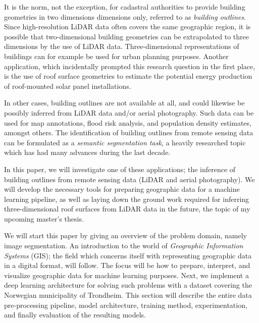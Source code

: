 It is the norm, not the exception, for cadastral authorities to provide building geometries in two dimensions dimensions only, referred to as \textit{building outlines}.
Since high-resolution LiDAR data often covers the same geographic region, it is possible that two-dimensional building geometries can be extrapolated to three dimensions by the use of LiDAR data.
Three-dimensional representations of buildings can for example be used for urban planning purposes.
Another application, which incidentally prompted this research question in the first place, is the use of roof surface geometries to estimate the potential energy production of roof-mounted solar panel installations.

In other cases, building outlines are not available at all, and could likewise be possibly inferred from LiDAR data and/or aerial photography.
Such data can be used for map annotations, flood risk analysis, and population density estimates, amongst others.
The identification of building outlines from remote sensing data can be formulated as a \textit{semantic segmentation task}, a heavily researched topic which has had many advances during the last decade.

In this paper, we will investigate one of these applications; the inference of building outlines from remote sensing data (LiDAR and aerial photography).
We will develop the necessary tools for preparing geographic data for a machine learning pipeline, as well as laying down the ground work required for inferring three-dimensional roof surfaces from LiDAR data in the future, the topic of my upcoming master's thesis.




We will start this paper by giving an overview of the problem domain, namely image segmentation.
An introduction to the world of \textit{Geographic Information Systems} (GIS); the field which concerns itself with representing geographic data in a digital format, will follow.
The focus will be how to prepare, interpret, and visualize geographic data for machine learning purposes.
Next, we implement a deep learning architecture for solving such problems with a dataset covering the Norwegian municipality of Trondheim.
This section will describe the entire data pre-processing pipeline, model architecture, training method, experimentation, and finally evaluation of the resulting models.


